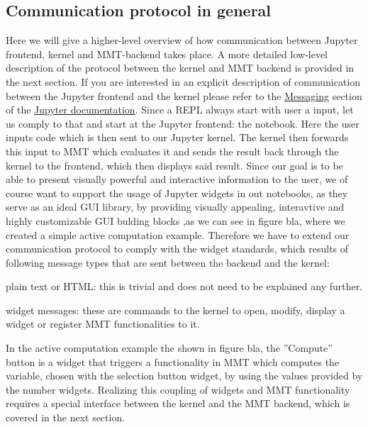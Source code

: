 \subsection{Communication protocol in general}
Here we will give a higher-level overview of how communication between Jupyter frontend, kernel and MMT-backend takes place. A more detailed low-level description of the protocol between the kernel and MMT backend is provided in the next section. If you are interested in an explicit description of communication between the Jupyter frontend and the kernel please refer to the \hyperlink{https://jupyter-client.readthedocs.io/en/latest/messaging.html}{Messaging} section of the \hyperlink{http://jupyter.org/documentation}{Jupyter documentation}. 
Since a REPL always start with user a input, let us comply to that and start at the Jupyter frontend: the notebook. Here the user inputs code which is then sent to our Jupyter kernel. 
The kernel then forwards this input to MMT which evaluates it and sends the result back through the kernel to the frontend, which then displays said result. Since our goal is to be able to present visually powerful and interactive information to the user, we of course want to support the usage of Jupyter widgets in out notebooks, as they serve as an ideal GUI library, by providing visually appealing, interavtive and highly customizable GUI bulding blocks ,as we can see in figure bla, where we created a simple active computation example.
Therefore we have to extend our communication protocol to comply with the widget standards, which results of following message types that are sent between the backend and the kernel:
\begin{inparaenum}[\em 1\rm )]
\item plain text or HTML: this is trivial and does not need to be explained any further.
\item widget messages: these are commands to the kernel to open, modify, display a widget or register MMT functionalities to it.
\end{inparaenum}
In the active computation example the shown in figure bla, the ''Compute'' button is a widget that triggers a functionality in MMT which computes the variable, chosen with the selection button widget, by using the values provided by the number widgets. Realizing this coupling of widgets and MMT functionality requires a special interface between the kernel and the MMT backend, which is covered in the next section.


